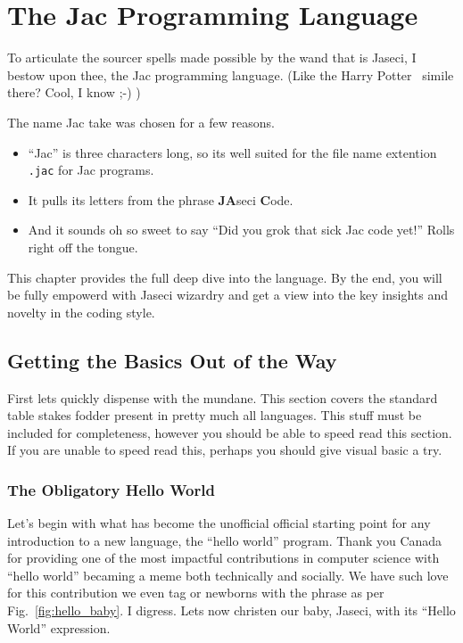 \chapter{The Jac Programming Language}

To articulate the sourcer spells made possible by the wand that is Jaseci, I bestow upon thee, the Jac programming language. (Like the Harry Potter~\cite{harrypotter} simile there? Cool, I know ;-) )
\par
The name Jac take was chosen for a few reasons.
\begin{itemize}
    \item ``Jac'' is three characters long, so its well suited for the file name extention \texttt{.jac} for Jac programs.
    \item It pulls its letters from the phrase \textbf{JA}seci \textbf{C}ode.
    \item And it sounds oh so sweet to say ``Did you \gls{grok} that \gls{sick} Jac code yet!'' Rolls right off the tongue.
\end{itemize}
\par
This chapter provides the full deep dive into the language. By the end, you will be fully empowerd with Jaseci wizardry and get a view into the key insights and novelty in the coding style.

\section{Getting the Basics Out of the Way}

First lets quickly dispense with the mundane. This section covers the standard table stakes fodder present in pretty much all languages. This stuff must be included for completeness, however you should be able to speed read this section.  If you are unable to speed read this, perhaps you should give visual basic a try.
\subsection{The Obligatory Hello World}
\printfigHelloWorldBaby
Let's begin with what has become the unofficial official starting point for any introduction to a new language, the ``hello world'' program. Thank you Canada for providing one of the most impactful contributions in computer science with ``hello world'' becaming a meme both technically and socially. We have such love for this contribution we even tag or newborns with the phrase as per Fig.~\ref{fig:hello_baby}. I digress. Lets now \gls{christen} our baby, Jaseci, with its ``Hello World'' expression.

